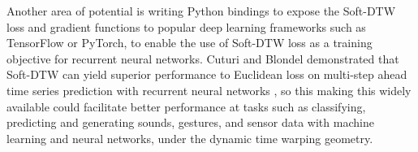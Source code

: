 \documentclass[12pt, letterpaper]{article}
\begin{document}
Another area of potential is writing Python bindings to expose the Soft-DTW loss
and gradient functions to popular deep learning frameworks such as TensorFlow or
PyTorch, to enable the use of Soft-DTW loss as a training objective for
recurrent neural networks. Cuturi and Blondel demonstrated that Soft-DTW can
yield superior performance to Euclidean loss on multi-step ahead time series
prediction with recurrent neural networks \cite{cuturi_soft-dtw_2018}, so this
making this widely available could facilitate better performance at tasks such
as classifying, predicting and generating sounds, gestures, and sensor data with
machine learning and neural networks, under the dynamic time warping geometry.

\printbibliography[]
\end{document}
